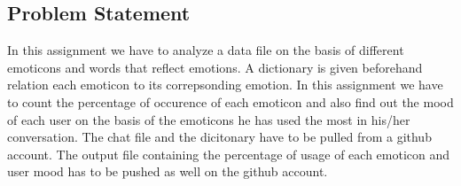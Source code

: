 \documentclass[a4paper,12pt]{article}
\begin{document}
  \pagebreak
  \begin{center}
    \section{Problem Statement}
  \end{center}
  \begin{small}      
     In this assignment we have to analyze a data file on the basis of different emoticons and words that reflect emotions. A dictionary is
     given beforehand relation each emoticon to its correpsonding emotion. In this assignment we have to count the percentage of occurence of each emoticon
     and also find out the mood of each user on the basis of the emoticons he has used the most in his/her conversation. The chat file and the 
     dicitonary have to be pulled from a github account. The output file containing the percentage of usage of each emoticon and user mood has to be pushed as well on the github account.\\
     \end{small}
    
\end{document}
